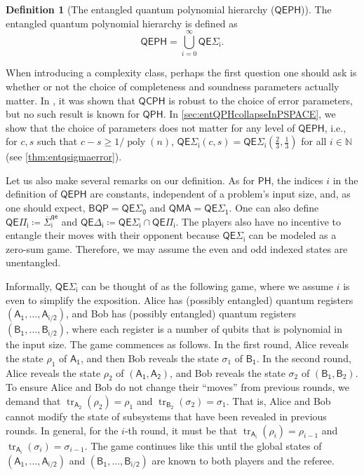 \documentclass[11pt]{article}
\theoremstyle{definition}
\newtheorem{definition}[theorem]{Definition}
\DeclareMathOperator{\tr}{tr}
\DeclareMathOperator{\poly}{poly}
\newcommand{\nats}{\mathbb N}
\newcommand{\N}{\nats}
\newcommand{\class}[1]{\ensuremath{\mathsf{#1}}\xspace}
\newcommand{\BQP}{\class{BQP}}
\newcommand{\QMA}{\class{QMA}}
\newcommand{\PH}{\class{PH}}
\newcommand{\QCPH}{\class{QCPH}}
\newcommand{\QPH}{\class{QPH}}
\newcommand{\QEPH}{\class{QEPH}}
\newcommand{\entQSigmai}[1][i]{\class{QE\Sigma_{#1}}}
\newcommand{\entQPii}[1][i]{\class{QE\Pi_{#1}}}
\newcommand{\entQDeltai}[1][i]{\class{QE\Delta_{#1}}}
\newcommand{\qreg}[1]{\mathsf{#1}}
\begin{document}
\begin{definition}[The entangled quantum polynomial hierarchy ($\QEPH$)]\label{def:entqph}
    The entangled quantum polynomial hierarchy is defined as 
    \[\QEPH = \bigcup_{i = 0}^{\infty} \entQSigmai[i].\]
\end{definition}

When introducing a complexity class, perhaps the first question one should ask is whether or not the choice of completeness and soundness parameters actually matter. 
In \cite[Theorem 2.6]{GSSSY22_qph}, it was shown that $\QCPH$ is robust to the choice of error parameters, but no such result is known for $\QPH$.
In \cref{sec:entQPHcollapseInPSPACE}, we show that the choice of parameters does not matter for any level of $\QEPH$, i.e., for $c, s$ such that $c-s \geq 1/\poly(n)$, $\entQSigmai(c,s) = \entQSigmai(\frac{2}{3}, \frac{1}{3})$ for all $i \in \N$ (see \cref{thm:entqsigmaerror}).

Let us also make several remarks on our definition. 
As for $\PH$, the indices $i$ in the definition of $\QEPH$ are constants, independent of a problem's input size, and, as one should expect, $\BQP = \entQSigmai[0]$ and $\QMA=\entQSigmai[1]$. 
One can also define $\entQPii[i] \coloneqq \class{\overline{\Sigma}_i^{qe}}$ and $\entQDeltai[i] \coloneqq \entQSigmai \cap \entQPii$. 
The players also have no incentive to entangle their moves with their opponent because $\entQSigmai$ can be modeled as a zero-sum game. 
Therefore, we may assume the even and odd indexed states are unentangled. 


Informally, $\entQSigmai$ can be thought of as the following game, where we assume $i$ is even to simplify the exposition.
Alice has (possibly entangled) quantum registers $(\qreg{A_1}, \ldots, \qreg{A_{i/2}})$,
and Bob has (possibly entangled) quantum registers $(\qreg{B_1}, \ldots, \qreg{B_{i/2}})$,
where each register is a number of qubits that is polynomial in the input size. 
The game commences as follows. In the first round, Alice reveals the state $\rho_1$ of $\qreg{A_1}$, and then Bob reveals the state $\sigma_1$ of $\qreg{B_1}$. 
In the second round, Alice reveals the state $\rho_2$ of $(\qreg{A_1}, \qreg{A_2})$, and Bob reveals the state $\sigma_2$ of $(\qreg{B_1}, \qreg{B}_2)$. 
To ensure Alice and Bob do not change their ``moves'' from previous rounds, we demand that $\tr_{\qreg{A_2}}(\rho_2) = \rho_1$ and $\tr_{\qreg{B_2}}(\sigma_2) = \sigma_1$. That is, Alice and Bob cannot modify the state of subsystems that have been revealed in previous rounds. 
In general, for the $i$-th round, it must be that 
$\tr_{\qreg{A_i}}(\rho_i) = \rho_{i-1}$ and 
$\tr_{\qreg{A_i}}(\sigma_i) = \sigma_{i-1}$.
The game continues like this until the global states of $(\qreg{A_1}, \ldots, \qreg{A_{i/2}})$  and $(\qreg{B_1}, \ldots, \qreg{B_{i/2}})$ are known to both players and the referee. 
\end{document}
